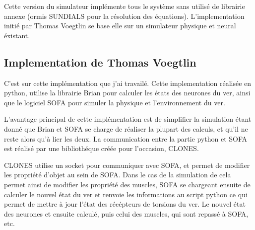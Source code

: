 Cette version du simulateur implémente tous le système sans utilisé de librairie
annexe (ormis SUNDIALS pour la résolution des équations). L'implementation initié
par Thomas Voegtlin se base elle sur un simulateur physique et neural éxistant.


\subsection{Implementation de Thomas Voegtlin} %
\label{sub:Implementation de Thomas Voegtlin}

C'est sur cette implémentation que j'ai travailé. Cette implementation réalisée
en python, utilise la librairie Brian\cite{Goodman2008} pour calculer les états
des neurones du ver, ainsi que le logiciel SOFA pour simuler la physique et
l'environnement du ver.

L'avantage principal de cette implémentation est de simplifier la simulation
étant donné que Brian et SOFA se charge de réaliser la plupart des calculs, et
qu'il ne reste alors qu'à lier les deux. La communication entre la partie
python et SOFA est réalisé par une bibliothéque créée pour l'occasion, CLONES.

CLONES utilise un socket pour communiquer avec SOFA, et permet de modifier les
propriété d'objet au sein de SOFA. Dans le cas de la simulation de \celeg{}
cela permet ainsi de modifier les propriété des muscles, SOFA se chargeant
ensuite de calculer le nouvel état du ver et renvoie les informations au script
python ce qui permet de mettre à jour l'état des récépteurs de torsions du ver.
Le nouvel état des neurones et ensuite calculé, puis celui des muscles, qui
sont repassé à SOFA, etc.



